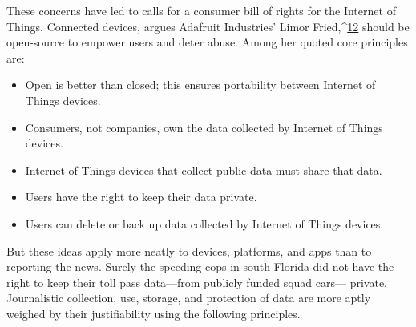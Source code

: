 \begin{itemize}
These concerns have led to calls for a consumer bill of rights for the Internet
of Things. Connected devices, argues Adafruit Industries' Limor Fried,^{\href{#endnotes-culver}{12}}
should be open-source to empower users and deter abuse. Among her
quoted core principles are:

\begin{itemize}
\item Open is better than closed; this ensures portability between
Internet of Things devices.
\item Consumers, not companies, own the data collected by Internet
of Things devices.
\item Internet of Things devices that collect public data must share
that data.
\item Users have the right to keep their data private.
\item Users can delete or back up data collected by Internet of
Things devices.

\end{itemize}
But these ideas apply more neatly to devices, platforms, and apps than to
reporting the news. Surely the speeding cops in south Florida did not have
the right to keep their toll pass data—from publicly funded squad cars—
private. Journalistic collection, use, storage, and protection of data are more
aptly weighed by their justifiability using the following principles.


\end{itemize}
